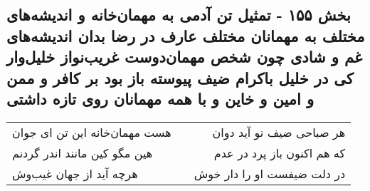 \begin{center}
\section*{بخش ۱۵۵ - تمثیل تن آدمی به مهمان‌خانه و اندیشه‌های مختلف به مهمانان مختلف عارف در رضا بدان اندیشه‌های غم و شادی چون شخص مهمان‌دوست غریب‌نواز خلیل‌وار کی در خلیل باکرام ضیف پیوسته باز بود بر کافر و ممن و امین و خاین و با همه مهمانان روی تازه داشتی}
\label{sec:sh155}
\begin{longtable}{l p{0.5cm} r}
هست مهمان‌خانه این تن ای جوان
&&
هر صباحی ضیف نو آید دوان
\\
هین مگو کین مانند اندر گردنم
&&
که هم اکنون باز پرد در عدم
\\
هرچه آید از جهان غیب‌وش
&&
در دلت ضیفست او را دار خوش
\\
\end{longtable}
\end{center}
